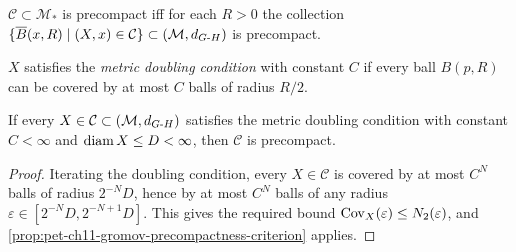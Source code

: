 \begin{corollary}
  \label{cor:pet-ch11-pointed-precompactness-criterion}
  $\mathcal{C}\subset\mathcal{M}_*$ is precompact iff for each $R>0$ the
  collection $\{\overline{B}(x,R)\mid(X,x)\in\mathcal{C}\}\subset(\mathcal{M},d_{G\text{-}H})$
  is precompact.
\end{corollary}

\begin{definition}
  \label{def:pet-ch11-metric-doubling-condition}
  $X$ satisfies the \emph{metric doubling condition} with constant $C$ if
  every ball $B(p,R)$ can be covered by at most $C$ balls of radius $R/2$.
\end{definition}

\begin{proposition}
  \label{prop:pet-ch11-doubling-implies-precompact}
  If every $X\in\mathcal{C}\subset(\mathcal{M},d_{G\text{-}H})$ satisfies the metric
  doubling condition with constant $C<\infty$ and $\operatorname{diam} X\le D<\infty$, then
  $\mathcal{C}$ is precompact.
\end{proposition}
\begin{proof}
  Iterating the doubling condition, every $X\in\mathcal{C}$ is covered by at
  most $C^N$ balls of radius $2^{-N}D$, hence by at most $C^N$ balls of any
  radius $\varepsilon\in[2^{-N}D,2^{-N+1}D]$. This gives the required bound
  $\operatorname{Cov}_X(\varepsilon)\le N_2(\varepsilon)$, and
  \cref{prop:pet-ch11-gromov-precompactness-criterion} applies.
\end{proof}


